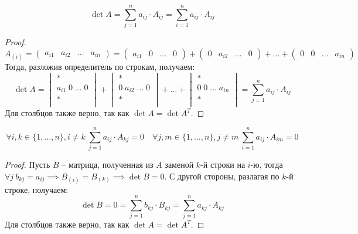 \documentclass[12pt]{article}
\begin{document}
\begin{theorem}
	\[\det A=\sum_{j=1}^{n}a_{ij}\cdot A_{ij}=\sum_{i=1}^{n}a_{ij}\cdot A_{ij}\]	
	\begin{proof}
		\[A_{(i)}=
			\begin{pmatrix}
				a_{i1} & a_{i2} & \ldots & a_{in}
			\end{pmatrix}=
			\begin{pmatrix}
				a_{i1} & 0 & \ldots & 0
			\end{pmatrix}+
			\begin{pmatrix}
				0 & a_{i2} & \ldots & 0
			\end{pmatrix}+\ldots+
			\begin{pmatrix}
				0 & 0 & \ldots & a_{in}
		\end{pmatrix}\]		Тогда, разложив определитель по строкам, получаем:
		\[\det A=
			\begin{vmatrix}
				*\\
				a_{i1}\;0\;\ldots\; 0\\
				*\\
			\end{vmatrix}+
			\begin{vmatrix}
				*\\
				0\;a_{i2}\;\ldots\; 0\\
				*\\
			\end{vmatrix}+\ldots+
			\begin{vmatrix}
				*\\
				0\;0\;\ldots\; a_{in}\\
				*\\
		\end{vmatrix}=\sum_{j=1}^{n}a_{ij}\cdot A_{ij}\]		Для столбцов
		также верно, так как $\det A=\det A^T$.
	\end{proof}
\end{theorem}
\begin{lemma}
	\[\forall i,k\in\{1,\ldots,n\},i\neq k\ \sum_{j=1}^{n}a_{ij}\cdot
		A_{kj}=0\quad \forall j,m\in\{1,\ldots,n\},j\neq
	m\ \sum_{i=1}^{n}a_{ij}\cdot A_{im}=0\]	
	\begin{proof}
		Пусть $B$ -- матрица, полученная из $A$ заменой $k$-й строки на
		$i$-ю, тогда $\forall j\ b_{kj}=a_{ij}\implies
		B_{(i)}=B_{(k)}\implies \det B=0$. С другой стороны, разлагая по
		$k$-й строке, получаем:
		\[\det B=0=\sum_{j=1}^{n}b_{kj}\cdot
		B_{kj}=\sum_{j=1}^{n}a_{kj}\cdot A_{kj}\]		Для столбцов также
		верно, так как $\det A=\det A^T$.
	\end{proof}
\end{lemma}
\end{document}
